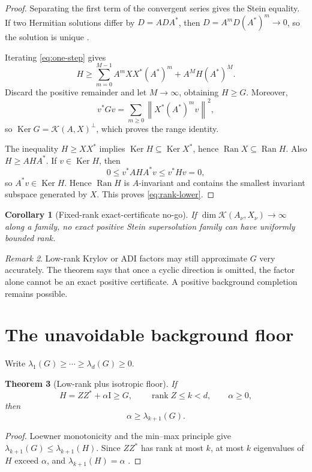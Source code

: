 \documentclass[11pt]{article}
\newtheorem{theorem}{Theorem}[section]
\newtheorem{corollary}[theorem]{Corollary}
\theoremstyle{definition}
\theoremstyle{remark}
\newtheorem{remark}[theorem]{Remark}
\newcommand{\Id}{\mathrm I}
\newcommand{\cK}{\mathcal K}
\newcommand{\Ran}{\operatorname{Ran}}
\newcommand{\rank}{\operatorname{rank}}
\newcommand{\Ker}{\operatorname{Ker}}
\newcommand{\norm}[1]{\left\lVert #1\right\rVert}
\begin{document}
\begin{proof}
Separating the first term of the convergent series gives the Stein
equality.  If two Hermitian solutions differ by \(D=ADA^*\), then
\(D=A^mD(A^*)^m\to0\), so the solution is unique
\citep{ZhouDoyleGlover1996,HornJohnson2013}.

Iterating \eqref{eq:one-step} gives
\[
 H\ge\sum_{m=0}^{M-1}A^mXX^*(A^*)^m+A^MH(A^*)^M.
\]
Discard the positive remainder and let \(M\to\infty\), obtaining \(H\ge G\).
Moreover,
\[
 v^*Gv=\sum_{m\ge0}\norm{X^*(A^*)^mv}^2,
\]
so \(\Ker G=\cK(A,X)^\perp\), which proves the range identity.

The inequality \(H\ge XX^*\) implies
\(\Ker H\subseteq\Ker X^*\), hence \(\Ran X\subseteq\Ran H\).  Also
\(H\ge AHA^*\).  If \(v\in\Ker H\), then
\[
 0\le v^*AHA^*v\le v^*Hv=0,
\]
so \(A^*v\in\Ker H\).  Hence \(\Ran H\) is \(A\)-invariant and contains
the smallest invariant subspace generated by \(X\).  This proves
\eqref{eq:rank-lower}.
\end{proof}

\begin{corollary}[Fixed-rank exact-certificate no-go]
If \(\dim\cK(A_\nu,X_\nu)\to\infty\) along a family, no exact positive
Stein supersolution family can have uniformly bounded rank.
\end{corollary}

\begin{remark}
Low-rank Krylov or ADI factors may still approximate \(G\) very accurately.
The theorem says that once a cyclic direction is omitted, the factor alone
cannot be an exact positive certificate.  A positive background completion
remains possible.
\end{remark}

\section{The unavoidable background floor}

Write
\(\lambda_1(G)\ge\cdots\ge\lambda_d(G)\ge0\).

\begin{theorem}[Low-rank plus isotropic floor]
\label{thm:floor}
If
\[
 H=ZZ^*+\alpha\Id\ge G,
 \qquad
 \rank Z\le k<d,
 \qquad
 \alpha\ge0,
\]
then
\begin{equation}
 \boxed{\alpha\ge\lambda_{k+1}(G).}
 \label{eq:floor}
\end{equation}
\end{theorem}

\begin{proof}
Loewner monotonicity and the min--max principle give
\(\lambda_{k+1}(G)\le\lambda_{k+1}(H)\).  Since \(ZZ^*\) has rank at most
\(k\), at most \(k\) eigenvalues of \(H\) exceed \(\alpha\), and
\(\lambda_{k+1}(H)=\alpha\) \citep{HornJohnson2013}.
\end{proof}
\end{document}
